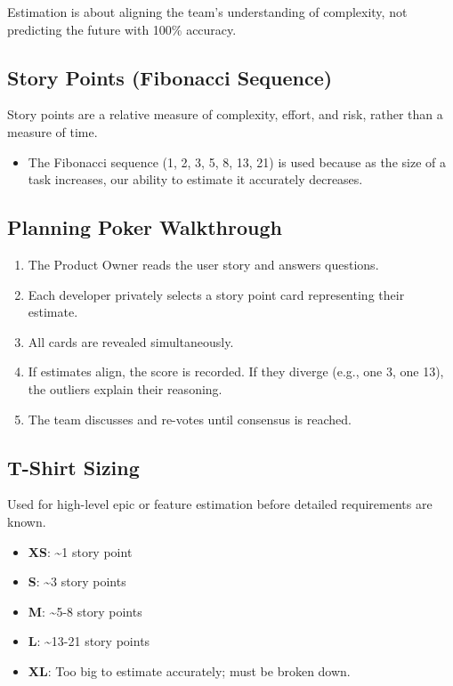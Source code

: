 \documentclass[
  11pt,
  openany,
  oneside]{book}
\providecommand{\tightlist}{%
  \setlength{\itemsep}{0pt}\setlength{\parskip}{0pt}}
\begin{document}
Estimation is about aligning the team's understanding of complexity, not
predicting the future with 100\% accuracy.

\subsection{Story Points (Fibonacci
Sequence)}\label{story-points-fibonacci-sequence}

Story points are a relative measure of complexity, effort, and risk,
rather than a measure of time.

\begin{itemize}
\tightlist
\item
  The Fibonacci sequence (1, 2, 3, 5, 8, 13, 21) is used because as the
  size of a task increases, our ability to estimate it accurately
  decreases.
\end{itemize}

\subsection{Planning Poker
Walkthrough}\label{planning-poker-walkthrough}

\begin{enumerate}
\def\labelenumi{\arabic{enumi}.}
\tightlist
\item
  The Product Owner reads the user story and answers questions.
\item
  Each developer privately selects a story point card representing their
  estimate.
\item
  All cards are revealed simultaneously.
\item
  If estimates align, the score is recorded. If they diverge (e.g., one
  3, one 13), the outliers explain their reasoning.
\item
  The team discusses and re-votes until consensus is reached.
\end{enumerate}

\subsection{T-Shirt Sizing}\label{t-shirt-sizing}

Used for high-level epic or feature estimation before detailed
requirements are known.

\begin{itemize}
\tightlist
\item
  \textbf{XS}: \textasciitilde1 story point
\item
  \textbf{S}: \textasciitilde3 story points
\item
  \textbf{M}: \textasciitilde5-8 story points
\item
  \textbf{L}: \textasciitilde13-21 story points
\item
  \textbf{XL}: Too big to estimate accurately; must be broken down.
\end{itemize}
\end{document}
